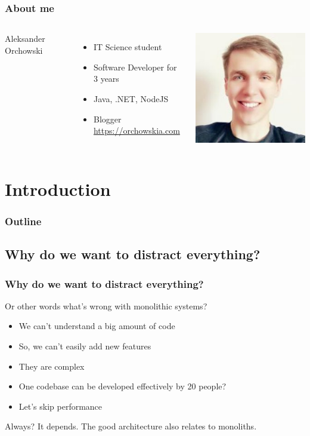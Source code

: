 \begin{frame}
\frametitle{About me}
\begin{columns}
	Aleksander Orchowski
	\begin{itemize}
		\item IT Science student
		\item Software Developer for 3 years
		\item Java, .NET, NodeJS
		\item Blogger  \href{https://orchowskia.com}{https://orchowskia.com}
	\end{itemize}
	\begin{center}
		\includegraphics[width=0.7\linewidth]{pictures/author-face}
	\end{center}	
\end{columns}
\end{frame}

\section{Introduction}
\begin{frame}
 \frametitle{Outline}
 \tableofcontents
\end{frame}

\subsection{Why do we want to distract everything?}
\begin{frame}
\frametitle{Why do we want to distract everything?}
Or other words what's wrong with monolithic systems?
\begin{itemize}
	\item We can't understand a big amount of code
	\item So, we can't easily add new features
	\item They are complex
	\item One codebase can be developed effectively by 20 people?
	\item Let's skip performance
\end{itemize}
Always? It depends. The good architecture also relates to monoliths.
\end{frame}

